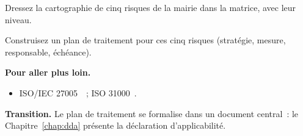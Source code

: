 \begin{boxexo}[title={\ding{45}\quad Exercice~13.9. Cartographie \niveauexpert}]
Dressez la cartographie de cinq risques de la mairie dans la matrice, avec leur
niveau.
\end{boxexo}

\begin{boxexo}[title={\ding{45}\quad Exercice~13.10. Plan de traitement \niveauexpert}]
Construisez un plan de traitement pour ces cinq risques (stratégie, mesure,
responsable, échéance).
\end{boxexo}

\bigskip

\begin{boxinfo}
\textbf{Pour aller plus loin.}
\begin{itemize}
    \item ISO/IEC 27005~\cite{iso27005}~; ISO 31000~\cite{iso31000}.
\end{itemize}
\end{boxinfo}

\begin{boxinfo}
\textbf{Transition.} Le plan de traitement se formalise dans un document
central~: le Chapitre~\ref{chap:dda} présente la déclaration d'applicabilité.
\end{boxinfo}
